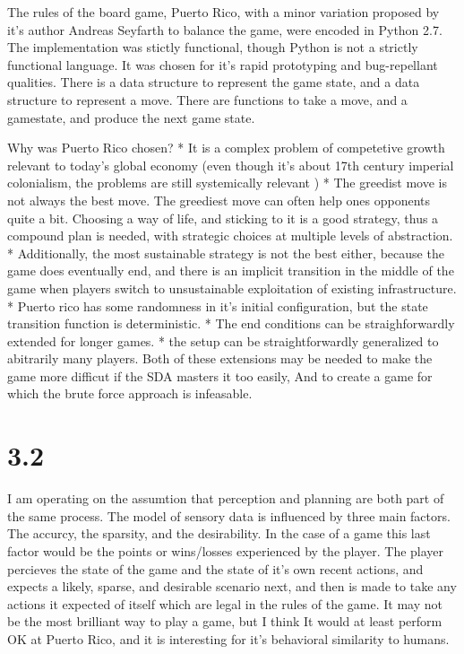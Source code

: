 \documentclass[11pt]{article}
\begin{document}
The rules of the board game, Puerto Rico, with a minor variation proposed by it's author Andreas Seyfarth to balance the game, were encoded in Python 2.7. The implementation was stictly functional, though Python is not a strictly functional language. It was chosen for it's rapid prototyping and bug-repellant qualities. There is a data structure to represent the game state, and a data structure to represent a move. There are functions to take a move, and a gamestate, and produce the next game state. 


Why was Puerto Rico chosen?
* It is a complex problem of competetive growth relevant to today's global economy (even though it's about 17th century imperial colonialism, the problems are still systemically relevant )
* The greedist move is not always the best move. The greediest move can often help ones opponents quite a bit. Choosing a way of life, and sticking to it is a good strategy, thus a compound plan is needed, with strategic choices at multiple levels of abstraction.
* Additionally, the most sustainable strategy is not the best either, because the game does eventually end, and there is an implicit transition in the middle of the game when players switch to unsustainable exploitation of existing infrastructure. 
* Puerto rico has some randomness in it's initial configuration, but the state transition function is deterministic. 
* The end conditions can be straighforwardly extended for longer games.
* the setup can be straightforwardly generalized to abitrarily many players. Both of these extensions may be needed to make the game more difficut if the SDA masters it too easily, And to create a game for which the brute force approach is infeasable.

\section{3.2}
\label{Implementation of SDA-based decider}

I am operating on the assumtion that perception and planning are both part of the same process. The model of sensory data is influenced by three main factors. The accurcy, the sparsity, and the desirability. In the case of a game this last factor would be the points or wins/losses experienced by the player. The player percieves the state of the game and the state of it's own recent actions, and expects a likely, sparse, and desirable scenario next, and then is made to take any actions it expected of itself which are legal in the rules of the game. It may not be the most brilliant way to play a game, but I think It would at least perform OK at Puerto Rico, and it is interesting for it's behavioral similarity to humans.
\end{document}
